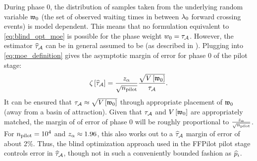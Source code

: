 During phase 0, the distribution of samples taken from the underlying random variable $\mathfrak{w}_{0}$ (\ie the set of observed waiting times in between ${\lambda}_{0}$ forward crossing events) is model dependent. This means that no formulation equivalent to \eqref{eq:blind_opt_moe} is possible for the phase weight $w_{0} = \tau_{\mathcal{A}}$. However, the estimator $\widehat{\tau}_{\mathcal{A}}$ can be in general assumed to be \ncon (as described in ). Plugging  into \eqref{eq:moe_definition} gives the asymptotic margin of error for phase 0 of the pilot stage:
    \begin{equation}
        {\zeta}_{} \left[ \widehat{\tau}_{\mathcal{A}} \right] = \frac{z_{\alpha}}{\sqrt{n_{\textrm{pilot}}}} \frac{\sqrt{V \left[ \mathfrak{w}_{0} \right]}}{\tau_{\mathcal{A}}}.
    \end{equation}
It can be ensured that $\tau_{\mathcal{A}} \approx \sqrt{V \left[ \mathfrak{w}_{0} \right]}$ through appropriate placement of  $\mathfrak{w}_{0}$ (\ie away from a basin of attraction). Given that $\tau_{\mathcal{A}}$ and $V \left[ \mathfrak{w}_{0} \right]$ are appropriately matched, the margin of of error of phase 0 will be roughly proportional to $\frac{z_{\alpha}}{\sqrt{n_{\textrm{pilot}}}}$. For $n_{\textrm{pilot}} = 10^4$ and $z_{\alpha} \approx 1.96$, this also works out to a $\widehat{\tau}_{\mathcal{A}}$ margin of error of about 2\%. Thus, the blind optimization approach used in the FFPilot pilot stage controls error in $\widehat{\tau}_{\mathcal{A}}$, though not in such a conveniently bounded fashion as $\widehat{p}_{i}$.

%
